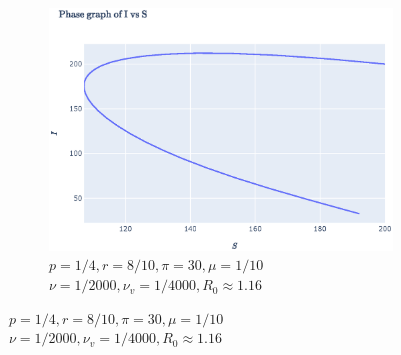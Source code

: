 \documentclass[11pt]{article}
\begin{document}
\begin{figure}[th]
	\begin{subfigure}{0.49\textwidth}
	  \centering
	  \includegraphics[width=\linewidth]{../figures/ex2_IS_1.eps}  
	  \caption{$p = 1/4,
	  		r = 8/10, 
	  		\pi = 30,
	  		\mu = 1/10 $\\
	  		$\nu = 1/2000,
	  		\nu_v = 1/4000, R_0 \approx 1.16$}
	  

\end{subfigure}
\end{figure}
\end{document}
